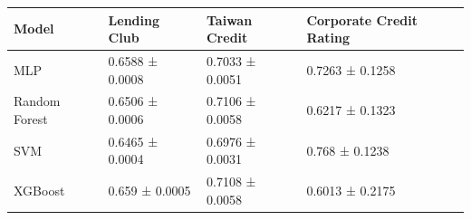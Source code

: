 \begin{tabular}{llll}
\toprule
Model & Lending Club & Taiwan Credit & Corporate Credit Rating \\
\midrule
MLP & 0.6588 ± 0.0008 & 0.7033 ± 0.0051 & 0.7263 ± 0.1258 \\
Random Forest & 0.6506 ± 0.0006 & 0.7106 ± 0.0058 & 0.6217 ± 0.1323 \\
SVM & 0.6465 ± 0.0004 & 0.6976 ± 0.0031 & 0.768 ± 0.1238 \\
XGBoost & 0.659 ± 0.0005 & 0.7108 ± 0.0058 & 0.6013 ± 0.2175 \\
\bottomrule
\end{tabular}
